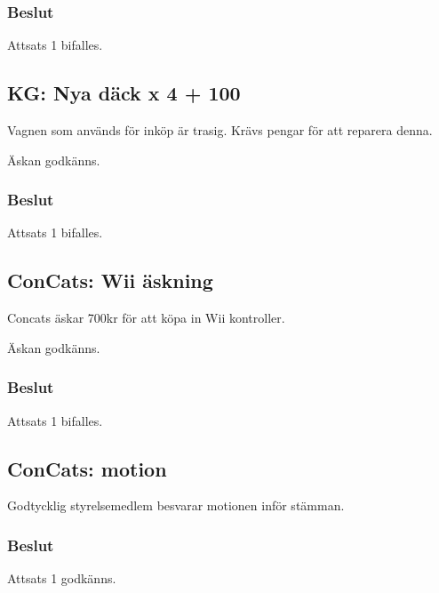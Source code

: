 \documentclass[protokoll]{dvd}
\begin{document}
\subsubsection{Beslut} 
\begin{attsatser}
\item Attsats 1 bifalles. 
\end{attsatser}

\subsection{KG: Nya däck x 4 + 100}
Vagnen som används för inköp är trasig. Krävs pengar för att reparera denna. 
\begin{attsatser}
    \item Äskan godkänns.
\end{attsatser}
\subsubsection{Beslut} 
\begin{attsatser}     
\item Attsats 1 bifalles. 
\end{attsatser}

\subsection{ConCats: Wii äskning}
Concats äskar 700kr för att köpa in Wii kontroller. 
\begin{attsatser}
    \item Äskan godkänns.
\end{attsatser}
\subsubsection{Beslut} 
\begin{attsatser}     
\item Attsats 1 bifalles. 
\end{attsatser}

\subsection{ConCats: motion}

\begin{attsatser}
    \item Godtycklig styrelsemedlem besvarar motionen inför stämman.
\end{attsatser}
\subsubsection{Beslut} 
\begin{attsatser}     
\item Attsats 1 godkänns.
\end{attsatser}
\end{document}
